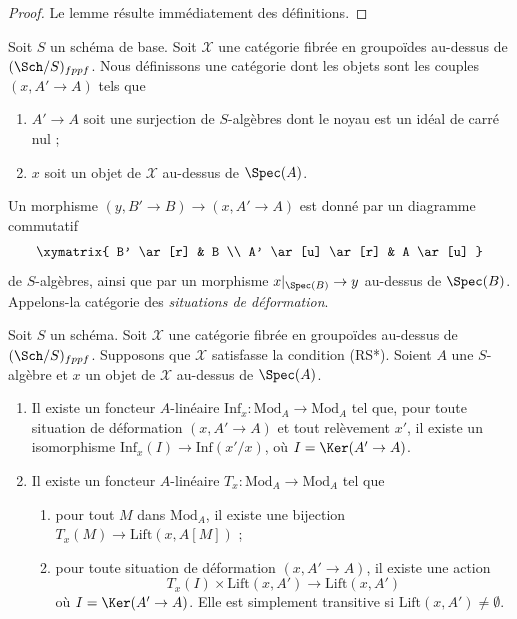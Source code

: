 \begin{proof}
Le lemme résulte immédiatement des définitions.
\end{proof}

\noindent
Soit $S$ un schéma de base. Soit $\mathcal{X}$ une catégorie fibrée
en groupoïdes au-dessus de $(\Sch/S)_{fppf}$. Nous définissons une catégorie dont les objets sont
les couples $(x, A' \to A)$ tels que
\begin{enumerate}
\item $A' \to A$ soit une surjection de $S$-algèbres dont le noyau
est un idéal de carré nul ;
\item $x$ soit un objet de $\mathcal{X}$ au-dessus de $\Spec(A)$.
\end{enumerate}
Un morphisme $(y, B' \to B) \to (x, A' \to A)$ est donné par un diagramme
commutatif
$$
\xymatrix{
B' \ar[r] & B \\
A' \ar[u] \ar[r] & A \ar[u]
}
$$
de $S$-algèbres, ainsi que par un morphisme $x|_{\Spec(B)} \to y$ au-dessus de
$\Spec(B)$. Appelons-la catégorie des {\it situations de déformation}.

\begin{lemma}
\label{lemma-properties-lift-RS-star}
Soit $S$ un schéma. Soit $\mathcal{X}$ une catégorie
fibrée en groupoïdes au-dessus de $(\Sch/S)_{fppf}$. Supposons que $\mathcal{X}$ satisfasse
la condition (RS*). Soient $A$ une $S$-algèbre et $x$ un objet de
$\mathcal{X}$ au-dessus de $\Spec(A)$.
\begin{enumerate}
\item Il existe un foncteur $A$-linéaire
$\text{Inf}_x : \text{Mod}_A \to \text{Mod}_A$
tel que, pour toute situation de déformation $(x, A' \to A)$ et tout relèvement $x'$,
il existe un isomorphisme $\text{Inf}_x(I) \to \text{Inf}(x'/x)$, où
$I = \Ker(A' \to A)$.
\item Il existe un foncteur $A$-linéaire
$T_x : \text{Mod}_A \to \text{Mod}_A$
tel que
\begin{enumerate}
\item pour tout $M$ dans $\text{Mod}_A$, il existe une bijection
$T_x(M) \to \text{Lift}(x, A[M])$ ;
\item pour toute situation de déformation $(x, A' \to A)$, il existe une action
$$
T_x(I) \times \text{Lift}(x, A') \to \text{Lift}(x, A')
$$
où $I = \Ker(A' \to A)$. Elle est simplement transitive si
$\text{Lift}(x, A') \not = \emptyset$.
\end{enumerate}
\end{enumerate}
\end{lemma}

